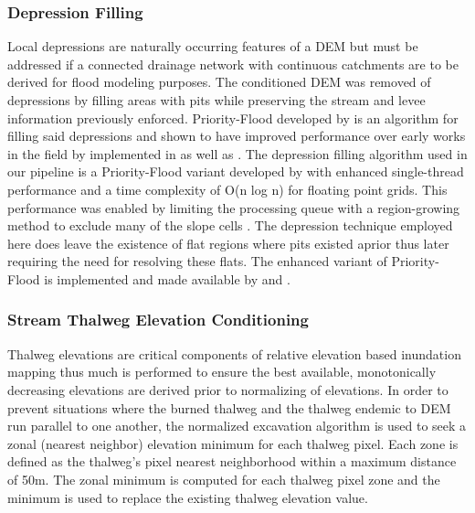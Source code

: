 \subsubsection{Depression Filling}
\label{sssec:depression_filling}
%
Local depressions are naturally occurring features of a DEM but must be addressed if a connected drainage network with continuous catchments are to be derived for flood modeling purposes.
The conditioned DEM was removed of depressions by filling areas with pits while preserving the stream and levee information previously enforced.
Priority-Flood developed by  is an algorithm for filling said depressions and shown to have improved performance over early works in the field by  implemented in  as well as .
The depression filling algorithm used in our pipeline is a Priority-Flood variant developed by \cite{zhou2016efficient} with enhanced single-thread performance and a time complexity of O(n log n) for floating point grids.
This performance was enabled by limiting the processing queue with a region-growing method to exclude many of the slope cells \cite{zhou2016efficient}.
The depression technique employed here does leave the existence of flat regions where pits existed aprior thus later requiring the need for resolving these flats.
The enhanced variant of Priority-Flood is implemented and made available by  and .
%
\subsubsection{Stream Thalweg Elevation Conditioning}
\label{sssec:stream_thalweg_elevation_conditioning}
%
Thalweg elevations are critical components of relative elevation based inundation mapping thus much is performed to ensure the best available, monotonically decreasing elevations are derived prior to normalizing of elevations.
In order to prevent situations where the burned thalweg and the thalweg endemic to DEM run parallel to one another, the normalized excavation algorithm \cite{saunders1999preparation} is used to seek a zonal (nearest neighbor) elevation minimum for each thalweg pixel. 
Each zone is defined as the thalweg's pixel nearest neighborhood within a maximum distance of 50m.
The zonal minimum is computed for each thalweg pixel zone and the minimum is used to replace the existing thalweg elevation value.

